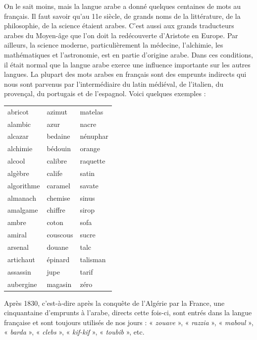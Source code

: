 On le sait moins, mais la langue arabe a donné quelques centaines de mots au français. Il faut savoir qu’au 11e siècle, de grands noms de la littérature, de la philosophie, de la science étaient arabes. C’est aussi aux grands traducteurs arabes du Moyen-âge que l’on doit la redécouverte d’Aristote en Europe. Par ailleurs, la science moderne, particulièrement la médecine, l’alchimie, les mathématiques et l’astronomie, est en partie d’origine arabe. Dans ces conditions, il était normal que la langue arabe exerce une influence importante sur les autres langues. La plupart des mots arabes en français sont des emprunts indirects qui nous sont parvenus par l’intermédiaire du latin médiéval, de l’italien, du provençal, du portugais et de l’espagnol. Voici quelques exemples :
\begin{center}
\begin{tabularx}{.94\linewidth}{|>{\centering\arraybackslash}X|>{\centering\arraybackslash}X|>{\centering\arraybackslash}X|}
\hline
abricot&azimut&matelas\\
alambic&azur&nacre\\
alcazar&bedaine&nénuphar\\
alchimie&bédouin&orange\\
alcool&calibre&raquette\\
algèbre&calife&satin\\
algorithme&caramel&savate\\
almanach&chemise&sinus\\
amalgame&chiffre&sirop\\
ambre&coton&sofa\\
amiral&couscous&sucre\\
arsenal&douane&talc\\
artichaut&épinard&talisman\\
assassin&jupe&tarif\\
aubergine&magasin&zéro\\\hline
\end{tabularx}
\end{center}
Après 1830, c’est-à-dire après la conquête de l’Algérie par la France, une cinquantaine d’emprunts à l’arabe, directs cette fois-ci, sont entrés dans la langue française et sont toujours utilisés de nos jours : « \textit{zouave} », « \textit{razzia} », « \textit{maboul} », « \textit{barda} », « \textit{clebs} », « \textit{kif-kif} », « \textit{toubib} », etc.

